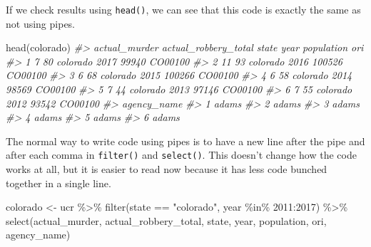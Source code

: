 \documentclass[
]{krantz}
\makeatletter
\newenvironment{Shaded}{\begin{snugshade}}{\end{snugshade}}
\newcommand{\CommentTok}[1]{\textcolor[rgb]{0.37,0.37,0.37}{\textit{#1}}}
\newcommand{\DecValTok}[1]{\textcolor[rgb]{0.06,0.06,0.06}{#1}}
\newcommand{\FunctionTok}[1]{\textcolor[rgb]{0,0,0}{#1}}
\newcommand{\NormalTok}[1]{#1}
\newcommand{\OtherTok}[1]{\textcolor[rgb]{0.37,0.37,0.37}{#1}}
\newcommand{\SpecialCharTok}[1]{\textcolor[rgb]{0,0,0}{#1}}
\newcommand{\StringTok}[1]{\textcolor[rgb]{0.5,0.5,0.5}{#1}}
\newenvironment{kframe}{%
\medskip{}
\setlength{\fboxsep}{.8em}
 \def\at@end@of@kframe{}%
 \ifinner\ifhmode%
  \def\at@end@of@kframe{\end{minipage}}%
  \begin{minipage}{\columnwidth}%
 \fi\fi%
 \def\FrameCommand##1{\hskip\@totalleftmargin \hskip-\fboxsep
 \colorbox{shadecolor}{##1}\hskip-\fboxsep
     \hskip-\linewidth \hskip-\@totalleftmargin \hskip\columnwidth}%
 \MakeFramed {\advance\hsize-\width
   \@totalleftmargin\z@ \linewidth\hsize
   \@setminipage}}%
 {\par\unskip\endMakeFramed%
 \at@end@of@kframe}
\renewenvironment{Shaded}{\begin{kframe}}{\end{kframe}}
\makeatother
\begin{document}
If we check results using \texttt{head()}, we can see that this code is exactly the same as not using pipes.

\begin{Shaded}
\begin{Highlighting}[]
\FunctionTok{head}\NormalTok{(colorado)}
\CommentTok{\#\textgreater{}   actual\_murder actual\_robbery\_total    state year population     ori}
\CommentTok{\#\textgreater{} 1             7                   80 colorado 2017      99940 CO00100}
\CommentTok{\#\textgreater{} 2            11                   93 colorado 2016     100526 CO00100}
\CommentTok{\#\textgreater{} 3             6                   68 colorado 2015     100266 CO00100}
\CommentTok{\#\textgreater{} 4             6                   58 colorado 2014      98569 CO00100}
\CommentTok{\#\textgreater{} 5             7                   44 colorado 2013      97146 CO00100}
\CommentTok{\#\textgreater{} 6             7                   55 colorado 2012      93542 CO00100}
\CommentTok{\#\textgreater{}   agency\_name}
\CommentTok{\#\textgreater{} 1       adams}
\CommentTok{\#\textgreater{} 2       adams}
\CommentTok{\#\textgreater{} 3       adams}
\CommentTok{\#\textgreater{} 4       adams}
\CommentTok{\#\textgreater{} 5       adams}
\CommentTok{\#\textgreater{} 6       adams}
\end{Highlighting}
\end{Shaded}

The normal way to write code using pipes is to have a new line after the pipe and after each comma in \texttt{filter()} and \texttt{select()}. This doesn't change how the code works at all, but it is easier to read now because it has less code bunched together in a single line.

\begin{Shaded}
\begin{Highlighting}[]
\NormalTok{colorado }\OtherTok{\textless{}{-}}\NormalTok{ ucr }\SpecialCharTok{\%\textgreater{}\%}
  \FunctionTok{filter}\NormalTok{(state }\SpecialCharTok{==} \StringTok{"colorado"}\NormalTok{,}
\NormalTok{         year }\SpecialCharTok{\%in\%} \DecValTok{2011}\SpecialCharTok{:}\DecValTok{2017}\NormalTok{) }\SpecialCharTok{\%\textgreater{}\%}
  \FunctionTok{select}\NormalTok{(actual\_murder, }
\NormalTok{         actual\_robbery\_total,}
\NormalTok{         state, }
\NormalTok{         year,}
\NormalTok{         population,}
\NormalTok{         ori, }
\NormalTok{         agency\_name)}
\end{Highlighting}
\end{Shaded}
\end{document}
